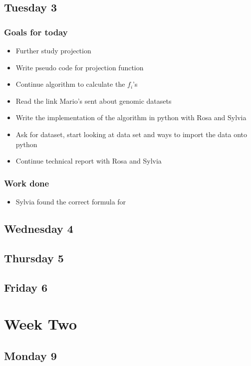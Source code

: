 \documentclass{article}
\begin{document}
\subsection{Tuesday 3}
\subsubsection{Goals for today}
    \begin{itemize}
        \item Further study projection
        \item Write pseudo code for projection function
        \item Continue algorithm to calculate the $f_i$'s 
        \item Read the link Mario's sent about genomic datasets
        \item Write the implementation of the algorithm in python with Rosa and Sylvia
        \item Ask for dataset, start looking at data set and ways to import the data onto python
        \item Continue technical report with Rosa and Sylvia
    \end{itemize}
\subsubsection{Work done}
    \begin{itemize}
        \item Sylvia found the correct formula for 
    \end{itemize}
\subsection{Wednesday 4}

\subsection{Thursday 5}

\subsection{Friday 6}

\section{Week Two}
\subsection{Monday 9}
\end{document}
